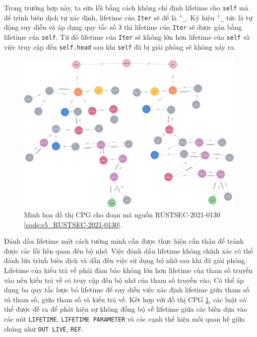 Trong trường hợp này, ta sửa lỗi bằng cách không chỉ định lifetime cho \texttt{self} mà để trình biên dịch tự xác định, lifetime của \texttt{Iter} sẽ để là \texttt{'\_}.
Ký hiệu \texttt{'\_} tức là tự động suy diễn và áp dụng quy tắc số 3 thì lifetime của \texttt{Iter} sẽ được gán bằng lifetime của \texttt{self}.
Từ đó lifetime của \texttt{Iter} sẽ không lớn hơn lifetime của \texttt{self} và việc truy cập đến \texttt{self.head} sau khi \texttt{self} đã bị giải phóng sẽ không xảy ra.

\begin{figure}[H]
    \includegraphics[width=1\columnwidth]{figures/c5/c5_RUSTSEC-2021-0130.png}
    \centering
    \caption{Minh họa đồ thị CPG cho đoạn mã nguồn RUSTSEC-2021-0130 \ref{code:c5_RUSTSEC-2021-0130}.}
    \label{img:c5_RUSTSEC-2021-0130}
\end{figure}

Đánh dấu lifetime một cách tường minh cần được thực hiện cẩn thận để tránh được các lỗi liên quan đến bộ nhớ.
Việc đánh dấu lifetime không chính xác có thể đánh lừa trình biên dịch và dẫn đến việc sử dụng bộ nhớ sau khi đã giải phóng.
Lifetime của kiểu trả về phải đảm bảo không lớn hơn lifetime của tham số truyền vào nếu kiểu trả về có truy cập đến bộ nhớ của tham số truyền vào.
Có thể áp dụng ba quy tắc lược bỏ lifetime để suy diễn việc xác định lifetime giữa tham số và tham số, giữa tham số và kiểu trả về.
Kết hợp với đồ thị CPG \ref{img:c5_RUSTSEC-2021-0130}, các luật có thể được đề ra để phát hiện sự không đồng bộ về lifetime giữa các biến dựa vào các nút \texttt{LIFETIME},
\texttt{LIFETIME PARAMETER} và các cạnh thể hiện mối quan hệ giữa chúng như \texttt{OUT LIVE}, \texttt{REF}.
